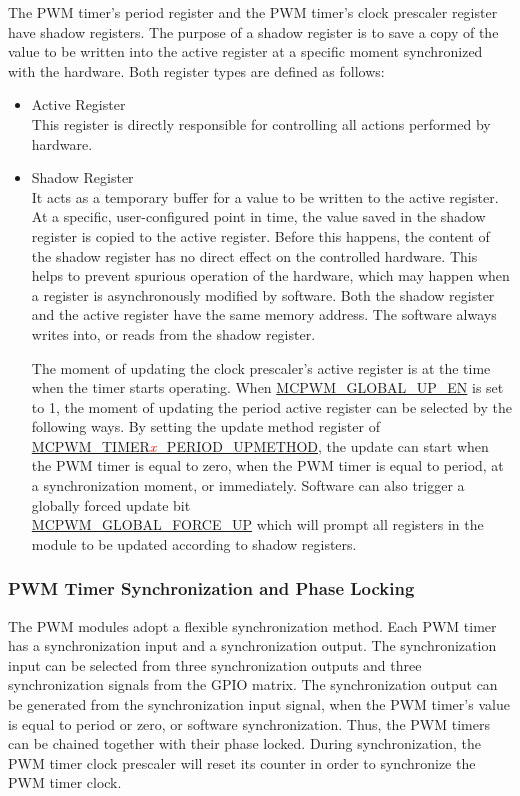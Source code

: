 \documentclass[main\_\_EN.tex]{subfiles}
\begin{document}
The PWM timer's period register and the PWM timer's clock prescaler register have shadow registers. The purpose of a shadow register is to save a copy of the value to be written into the active register at a specific moment synchronized with the hardware. Both register types are defined as follows:
\begin{itemize}
    \item Active Register \\
    This register is directly responsible for controlling all actions performed by hardware.
    \item Shadow Register \\
    It acts as a temporary buffer for a value to be written to the active register. At a specific, user-configured point in time, the value saved in the shadow register is copied to the active register. Before this happens, the content of the shadow register has no direct effect on the controlled hardware. This helps to prevent spurious operation of the hardware, which may happen when a register is asynchronously modified by software. Both the shadow register and the active register have the same memory address. The software always writes into, or reads from the shadow register.

    The moment of updating the clock prescaler's active register is at the time when the timer starts operating. When \hyperref[fielddesc:MCPWMGLOBALUPEN]{MCPWM\_GLOBAL\_UP\_EN} is set to 1, the moment of updating the period active register can be selected by the following ways. By setting the update method register of \hyperref[fielddesc:MCPWMTIMER0PERIODUPMETHOD]{MCPWM\_TIMER\textcolor{red}{\it{x}}\_PERIOD\_UPMETHOD}, the update can start when the PWM timer is equal to zero, when the PWM timer is equal to period, at a synchronization moment, or immediately. Software can also trigger a globally forced update bit\\ \hyperref[fielddesc:MCPWMGLOBALFORCEUP]{MCPWM\_GLOBAL\_FORCE\_UP} which will prompt all registers in the module to be updated according to shadow registers.
\end{itemize}

\subsubsection{PWM Timer Synchronization and Phase Locking}
The PWM modules adopt a flexible synchronization method. Each PWM timer has a synchronization input and a synchronization output. The synchronization input can be selected from three synchronization outputs and three synchronization signals from the GPIO matrix. The synchronization output can be generated from the synchronization input signal, when the PWM timer's value is equal to period or zero, or software synchronization. Thus, the PWM timers can be chained together with their phase locked. During synchronization, the PWM timer clock prescaler will reset its counter in order to synchronize the PWM timer clock.
\end{document}
